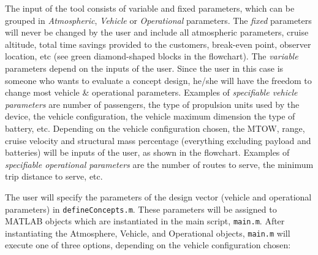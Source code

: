 The input of the tool consists of variable and fixed parameters, which can be grouped in \textit{Atmospheric}, \textit{Vehicle} or \textit{Operational} parameters. The \textit{fixed} parameters will never be changed by the user and include all atmospheric parameters, cruise altitude, total time savings provided to the customers, break-even point, observer location, etc (see green diamond-shaped blocks in the flowchart). The \textit{variable} parameters depend on the inputs of the user. Since the user in this case is someone who wants to evaluate a concept design, he/she will have the freedom to change most vehicle \& operational parameters. Examples of \textit{specifiable vehicle parameters} are number of passengers, the type of propulsion units used by the device, the vehicle configuration, the vehicle maximum dimension the type of battery, etc. Depending on the vehicle configuration chosen, the MTOW, range, cruise velocity and structural mass percentage (everything excluding payload and batteries) will be inputs of the user, as shown in the flowchart.  Examples of \textit{specifiable operational parameters} are the number of routes to serve, the minimum trip distance to serve, etc.



The user will specify the parameters of the design vector (vehicle and operational parameters) in \newline \texttt{defineConcepts.m}. These parameters will be assigned to MATLAB objects which are instantiated in the main script, \texttt{main.m}. After instantiating the Atmosphere, Vehicle, and Operational objects, \texttt{main.m} will execute one of three options, depending on the vehicle configuration chosen:

